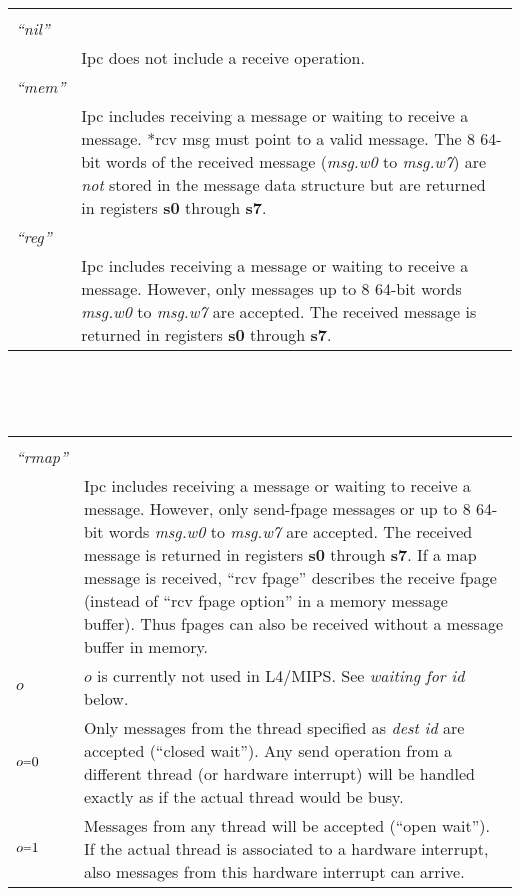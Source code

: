 \documentclass[a4paper,11pt,twoside,dvips]{book}
\makeatletter
\newcommand{\smaller}[1]{{\mathchoice 
           {\raisebox{1pt}{$\scriptstyle #1$}} 
           {\raisebox{1pt}{$\scriptstyle #1$}} 
           {\raisebox{0.5pt}{$\scriptscriptstyle #1$}} 
           {\raisebox{0.5pt}{$\scriptscriptstyle #1$}} 
}}
\newcommand{\EQ}{\smaller{=}}
\newlength{\Up}\setlength{\Up}{-\baselineskip}
\newlength{\Params}
\newenvironment{param}[1] 
{%
\setlength{\Params}{\textwidth}\addtolength{\Params}{-140pt}%
\par\vspace{5pt}%
\noindent\begin{minipage}{\textwidth} 
\noindent {\em #1}\\[\Up]%
\noindent\begin{tabular}{@{\hspace*{75pt}}lp{\Params}}%
\hspace*{30pt}&\\[\Up]%
} 
{%
\end{tabular}\end{minipage}\par\vspace{5pt}%
}
\newlength{\bboxw}
\newcommand{\impnote}[1]{\framebox{\textbf{MIPS Implementation Note:}} #1}
\newcommand{\reg}[1]{\mbox{\textbf{#1}}}
\newcommand{\abox}[2]{\setlength{\bboxw}{#2pt}\addtolength{\bboxw}{\bboxw}%
\addtolength{\bboxw}{\bboxw}\addtolength{\bboxw}{\bboxw}%
\framebox[\bboxw]{{\footnotesize #1\rule[-1ex]{0pt}{4ex}}}}
\newcommand{\cbox}[3]{\setlength{\bboxw}{#3pt}\addtolength{\bboxw}{\bboxw}%
\addtolength{\bboxw}{\bboxw}\addtolength{\bboxw}{\bboxw}%
\framebox[\bboxw]{{\footnotesize #1$_{\ (#2)}$\rule[-1ex]{0pt}{4ex}}}}
\makeatother
\begin{document}
\begin{param}{rcv descriptor} 
% 
{\em ``nil''}& \cbox{0xFFFFFFFFFFFFFFFF}{64}{32} \\[8pt] 
           &   Ipc does not include a receive operation.\\[10pt] 
%
{\em ``mem''}& \cbox{*rcv msg/4}{62}{30}\abox{0}{1}\abox{$o$}{1} \\[8pt] 
          &    Ipc includes receiving a message or 
               waiting to receive a message. *rcv msg must point
               to a valid message. The 8 64-bit words of the
               received message ({\em msg.w0} to {\em msg.w7}) are {\em not}
               stored in the message data structure but are returned
               in registers \reg{s0} through \reg{s7}. \\[10pt] 
% 
{\em ``reg''}& \cbox{0}{62}{30}\abox{0}{1}\abox{$o$}{1} \\[8pt] 
          &    Ipc includes receiving a message or 
               waiting to receive a message. However, only messages up to 8
               64-bit words {\em msg.w0} to {\em msg.w7} are accepted. The
               received message is returned in registers \reg{s0}
          through \reg{s7}.\\[10pt]
\end{param}

~	%

\begin{param}{rcv descriptor}
% 
{\em ``rmap''}& \cbox{rcv fpage}{62}{30}\abox{1}{1}\abox{$o$}{1} \\[8pt] 
          &    Ipc includes receiving a message or 
               waiting to receive a message. However, only send-fpage
               messages or up to 8
               64-bit words {\em msg.w0} to {\em msg.w7} are accepted. The
               received message is returned in registers  \reg{s0}
               through \reg{s7}.
               If a map message is received, ``rcv fpage'' describes the
               receive fpage (instead of ``rcv fpage option'' in a memory
               message buffer). Thus fpages can also be received without a
               message buffer in memory. 
               \\[10pt] 
% 
  $o$        & \impnote{$o$ is currently not used in L4/MIPS. See
               \emph{waiting for id} below}.\\[8pt]
  $o\EQ 0$&     Only messages from the thread specified as {\em dest id} are
               accepted (``closed wait''). Any send operation from a
               different thread (or
               hardware interrupt) will be handled exactly as if the actual
               thread would be busy. \\[8pt] 
  $o\EQ 1$&    Messages from any thread will be accepted (``open wait''). If
               the actual
               thread is associated to a hardware interrupt, also messages
               from this hardware interrupt can arrive. 
\end{param} 
\end{document}
